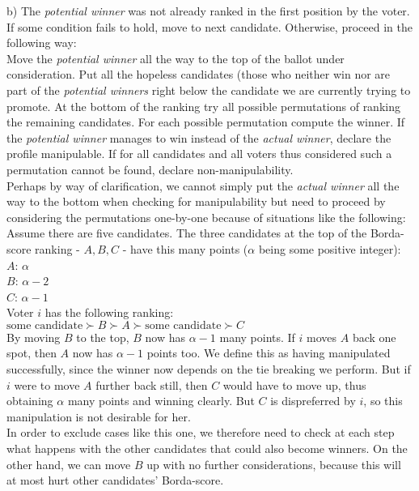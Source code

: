 \documentclass[10pt,a4paper]{article}
\begin{document}
\begin{itemize}
\begin{enumerate}
b) The \textit{potential winner} was not already ranked in the first position by the voter.\\
If some condition fails to hold, move to next candidate. Otherwise, proceed in the following way:\\
Move the \textit{potential winner} all the way to the top of the ballot under consideration. Put all the hopeless candidates (those who neither win nor are part of the \textit{potential winners} right below the candidate we are currently trying to promote. At the bottom of the ranking try all possible permutations of ranking the remaining candidates. For each possible permutation compute the winner. If the \textit{potential winner} manages to win instead of the \textit{actual winner}, declare the profile manipulable. If for all candidates and all voters thus considered such a permutation cannot be found, declare non-manipulability.\\
Perhaps by way of clarification, we cannot simply put the \textit{actual winner} all the way to the bottom when checking for manipulability but need to proceed by considering the permutations one-by-one because of situations like the following:\\
Assume there are five candidates. The three candidates at the top of the Borda-score ranking - $A,B,C$ - have this many points ($\alpha$ being some positive integer):\\
$A$: $\alpha$\\
$B$: $\alpha-2$\\
$C$: $\alpha-1$\\
Voter $i$ has the following ranking:\\
$\text{some candidate}\succ B \succ A \succ \text{some candidate} \succ C $\\
By moving $B$ to the top, $B$ now has $\alpha-1$ many points. If $i$ moves $A$ back one spot, then $A$ now has $\alpha-1$ points too. We define this as having manipulated successfully, since the winner now depends on the tie breaking we perform. But if $i$ were to move $A$ further back still, then $C$ would have to move up, thus obtaining $\alpha$ many points and winning clearly. But $C$ is dispreferred by $i$, so this manipulation is not desirable for her.\\ In order to exclude cases like this one, we therefore need to check at each step what happens with the other candidates that could also become winners. On the other hand, we can move $B$ up with no further considerations, because this will at most hurt other candidates' Borda-score.

\end{enumerate}
\end{itemize}
\end{document}
